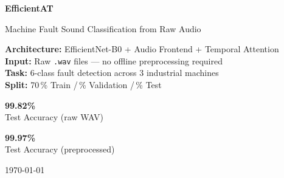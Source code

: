 \documentclass[12pt,a4paper]{article}
\begin{document}
\begin{titlepage}
  \centering
  \vspace*{1.5cm}

  {\fontsize{28}{34}\selectfont\bfseries\color{primaryblue}
   EfficientAT\par}

  \vspace{0.4cm}
  {\Large\color{darkgray} Machine Fault Sound Classification from Raw Audio\par}

  \vspace{1.2cm}
  \begin{tcolorbox}[colback=tablegray, colframe=primaryblue, width=0.80\textwidth,
                    rounded corners, boxrule=1pt]
    \centering
    \large
    \textbf{Architecture:} EfficientNet-B0 + Audio Frontend + Temporal Attention\\[4pt]
    \textbf{Input:} Raw \texttt{.wav} files — no offline preprocessing required\\[4pt]
    \textbf{Task:} 6-class fault detection across 3 industrial machines\\[4pt]
    \textbf{Split:} 70\,\% Train \;/\,\% Validation \;/\,\% Test
  \end{tcolorbox}

  \vspace{1.5cm}

  \begin{minipage}{0.42\textwidth}
    \centering
    \begin{tcolorbox}[colback=accentgreen!12, colframe=accentgreen,
                      rounded corners, boxrule=1.2pt]
      \centering
      {\fontsize{36}{42}\selectfont\bfseries\color{accentgreen} 99.82\%}\\[2pt]
      {\normalsize Test Accuracy (raw WAV)}
    \end{tcolorbox}
  \end{minipage}
  \hfill
  \begin{minipage}{0.42\textwidth}
    \centering
    \begin{tcolorbox}[colback=accentgreen!12, colframe=accentgreen,
                      rounded corners, boxrule=1.2pt]
      \centering
      {\fontsize{36}{42}\selectfont\bfseries\color{accentgreen} 99.97\%}\\[2pt]
      {\normalsize Test Accuracy (preprocessed)}
    \end{tcolorbox}
  \end{minipage}

  \vfill
  {\large\today}
\end{titlepage}
\end{document}
